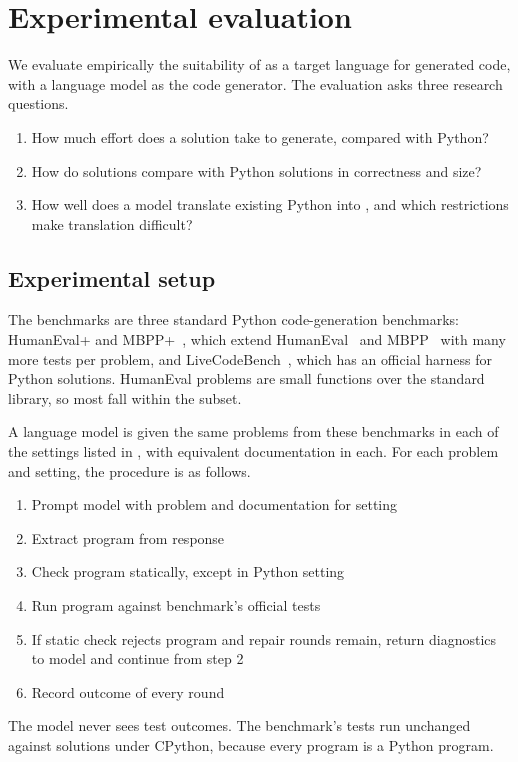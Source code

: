 \section{Experimental evaluation}
\label{sec:evaluation}

We evaluate empirically the suitability of \PurePy as a target language for generated code, with a language
model as the code generator. The evaluation asks three research questions.
\begin{enumerate}[label=\textbf{RQ\arabic*},ref=RQ\arabic*,leftmargin=*]
\item\label{rq:effort} How much effort does a \PurePy solution take to generate, compared with Python?
\item\label{rq:solutions} How do \PurePy solutions compare with Python solutions in correctness and size?
\item\label{rq:translation} How well does a model translate existing Python into \PurePy, and which restrictions make
translation difficult?
\end{enumerate}

\subsection{Experimental setup}
\label{sec:evaluation-setup}

The benchmarks are three standard Python code-generation benchmarks: HumanEval+ and MBPP+~\citep{liu2023},
which extend HumanEval~\citep{chen2021} and MBPP~\citep{austin2021} with many more tests per problem, and
LiveCodeBench~\citep{jain2025}, which has an official harness for Python solutions. HumanEval problems
are small functions over the standard library, so most fall within the \PurePy subset.

A language model is given the same problems from these benchmarks in each of the settings listed in
, with equivalent documentation in each. For each problem and setting, the
procedure is as follows.
\begin{enumerate}
\item Prompt model with problem and documentation for setting
\item Extract program from response
\item Check program statically, except in Python setting
\item Run program against benchmark's official tests
\item If static check rejects program and repair rounds remain, return diagnostics to model and continue from step 2
\item Record outcome of every round
\end{enumerate}
The model never sees test outcomes. The benchmark's tests run unchanged against \PurePy solutions under CPython,
because every \PurePy program is a Python program.


